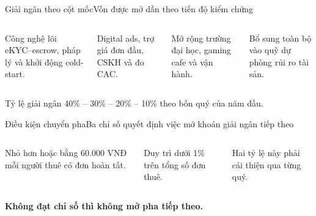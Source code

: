 \begin{frame}{Giải ngân theo cột mốc}{Vốn được mở dần theo tiến độ kiểm chứng}
  \vspace{1em}
  \begin{columns}[T,onlytextwidth]
      \par\vspace{.4em}
      Công nghệ lõi eKYC--escrow, pháp lý và khởi động cold-start.
      \par\vspace{.4em}
      Digital ads, trợ giá đơn đầu, CSKH và đo CAC.
      \par\vspace{.4em}
      Mở rộng trường đại học, gaming cafe và vận hành.
      \par\vspace{.4em}
      Bổ sung toàn bộ vào quỹ dự phòng rủi ro tài sản.
  \end{columns}
  \vfill
  \centering\small\color{cookieMuted}
  Tỷ lệ giải ngân 40\% -- 30\% -- 20\% -- 10\% theo bốn quý của năm đầu.
\end{frame}

\begin{frame}{Điều kiện chuyển pha}{Ba chỉ số quyết định việc mở khoản giải ngân tiếp theo}
  \vspace{1.2em}
  \begin{columns}[T,onlytextwidth]
      \par\vspace{.45em}
      Nhỏ hơn hoặc bằng 60.000 VNĐ mỗi người thuê có đơn hoàn tất.
      \par\vspace{.45em}
      Duy trì dưới 1\% trên tổng số đơn thuê.
      \par\vspace{.45em}
      Hai tỷ lệ này phải cải thiện qua từng quý.
  \end{columns}
  \vfill
  \centering\textcolor{mutuxOrange}{\textbf{Không đạt chỉ số thì không mở pha tiếp theo.}}
\end{frame}

